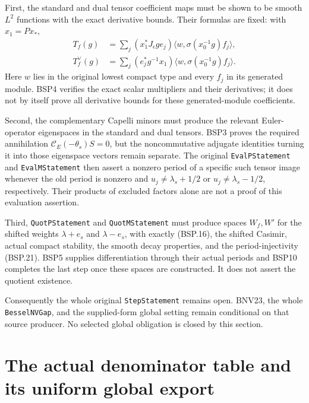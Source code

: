 \documentclass[11pt,a4paper]{article}
\numberwithin{equation}{section}
\theoremstyle{remark}\newtheorem{remark}[theorem]{Remark}
\begin{document}
First, the standard and dual tensor coefficient maps must be shown to be
smooth $L^2$ functions with the exact derivative bounds.  Their formulas
are fixed: with $x_1=P x_*$,
\[
 \begin{split}
 T_f(g)&=\sum_j (x_1^*J_\epsilon g e_j)
                  \langle w,\sigma(x_0^{-1}g)f_j\rangle,\\
 T_f^\vee(g)&=\sum_j (e_j^*g^{-1}x_1)
                  \langle w,\sigma(x_0^{-1}g)f_j\rangle.
 \end{split}
 \tag{BSP.22}
\]
Here $w$ lies in the original lowest compact type and every $f_j$ in
its generated module.  BSP4 verifies the exact scalar multipliers and
their derivatives; it does not by itself prove all derivative bounds
for these generated-module coefficients.

Second, the complementary Capelli minors must produce the relevant
Euler-operator eigenspaces in the standard and dual tensors.
BSP3 proves the required annihilation
$\mathcal C_E(-\theta_s)S=0$, but the noncommutative adjugate identities
turning it into those eigenspace vectors remain separate.
The original \texttt{Eval\allowbreak PStatement} and \texttt{Eval\allowbreak MStatement} then
assert a nonzero period of a specific such tensor image whenever
the old period is nonzero and
$u_j\ne\lambda_s+1/2$ or $u_j\ne\lambda_s-1/2$, respectively.
Their products of excluded factors alone are not a proof of this
evaluation assertion.

Third, \texttt{Quot\allowbreak PStatement} and \texttt{Quot\allowbreak MStatement} must produce
spaces $W_f,W'$ for the shifted weights $\lambda+e_s$ and $\lambda-e_s$,
with exactly (BSP.16), the shifted Casimir, actual compact stability,
the smooth decay properties, and the period-injectivity (BSP.21).
BSP5 supplies differentiation through their actual periods and BSP10
completes the last step once these spaces are constructed.  It does
not assert the quotient existence.

Consequently the whole original \texttt{Step\allowbreak Statement} remains open.
BNV23, the whole \texttt{Bessel\allowbreak NVGap}, and the supplied-form global setting
remain conditional on that source producer.  No selected global
obligation is closed by this section.


\section{The actual denominator table and its uniform global export}
\label{sec:denominator-export-v050}
\end{document}
